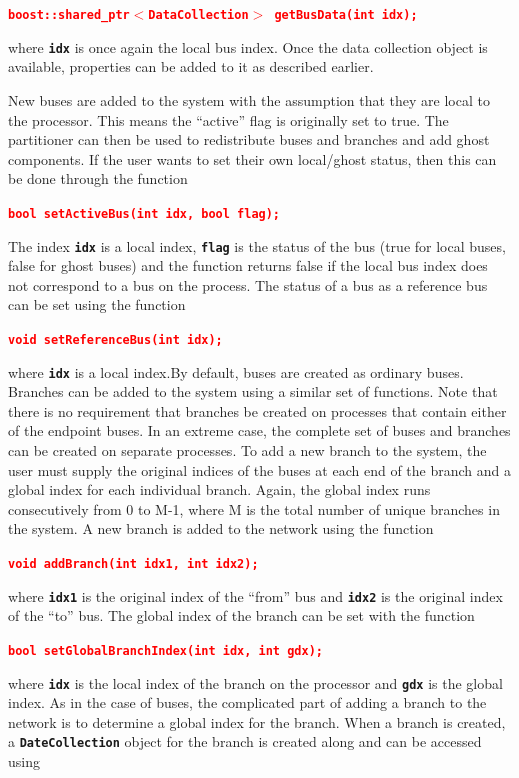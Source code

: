\documentclass[12pt]{report} %
\begin{document}
\textcolor{red}{\texttt{\textbf{boost::shared\_ptr$\boldsymbol{\mathrm{<}}$DataCollection$\boldsymbol{\mathrm{>}}$ getBusData(int idx);}}}

where \texttt{\textbf{idx}} is once again the local bus index. Once the data collection object is available, properties can be added to it as described earlier.

New buses are added to the system with the assumption that they are local to the processor. This means the ``active'' flag is originally set to true. The partitioner can then be used to redistribute buses and branches and add ghost components. If the user wants to set their own local/ghost status, then this can be done through the function

\textcolor{red}{\texttt{\textbf{bool setActiveBus(int idx, bool flag);}}}

The index \texttt{\textbf{idx}} is a local index, \texttt{\textbf{flag}} is the status of the bus (true for local buses, false for ghost buses) and the function returns false if the local bus index does not correspond to a bus on the process.
The status of a bus as a reference bus can be set using the function

\textcolor{red}{\texttt{\textbf{void setReferenceBus(int idx);}}}

where \texttt{\textbf{idx}} is a local index.By default, buses are created as ordinary buses.
Branches can be added to the system using a similar set of functions. Note that there is no requirement that branches be created on processes that contain either of the endpoint buses. In an extreme case, the complete set of buses and branches can be created on separate processes. To add a new branch to the system, the user must supply the original indices of the buses at each end of the branch and a global index for each individual branch. Again, the global index runs consecutively from 0 to M-1, where M is the total number of unique branches in the system. A new branch is added to the network using the function

\textcolor{red}{\texttt{\textbf{void addBranch(int idx1, int idx2);}}}

where \texttt{\textbf{idx1}} is the original index of the ``from'' bus and \texttt{\textbf{idx2}} is the original index of the ``to'' bus. The global index of the branch can be set with the function

\textcolor{red}{\texttt{\textbf{bool setGlobalBranchIndex(int idx, int gdx);}}}

where \texttt{\textbf{idx}} is the local index of the branch on the processor and \texttt{\textbf{gdx}} is the global index. As in the case of buses, the complicated part of adding a branch to the network is to determine a global index for the branch.
When a branch is created, a \texttt{\textbf{DateCollection}} object for the branch is created along and can be accessed using
\end{document}
